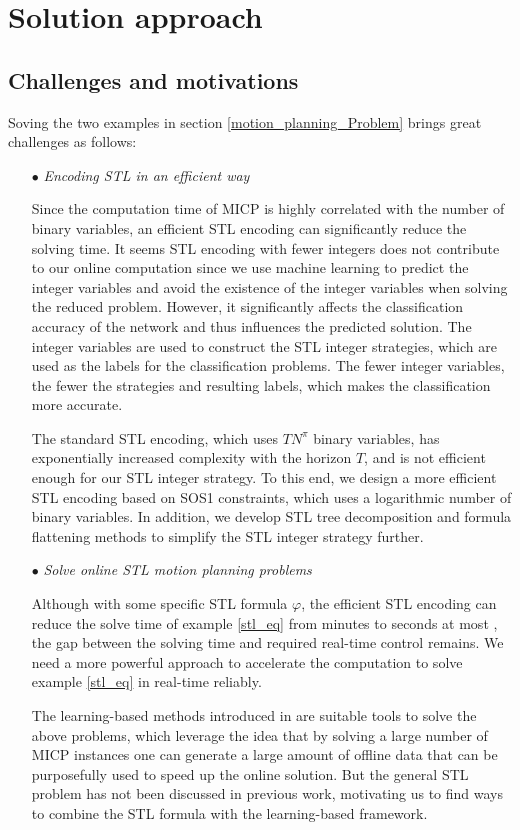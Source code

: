 \documentclass[a4paper]{report}
\begin{document}
\chapter{Solution approach}
\section{Challenges and motivations} 

Soving the two examples in section \ref{motion_planning_Problem} brings great challenges as follows: 

\begin{itemize}
   \item[$\bullet$] \textit{Encoding STL in an efficient way} 
   \item[] 
   Since the computation time of MICP is highly correlated with the number of binary variables, an efficient STL encoding can significantly reduce the solving time. It seems STL encoding with fewer integers does not contribute to our online computation since we use machine learning to predict the integer variables and avoid the existence of the integer variables when solving the reduced problem. However, it significantly affects the classification accuracy of the network and thus influences the predicted solution. The integer variables are used to construct the STL integer strategies, which are used as the labels for the classification problems. The fewer integer variables, the fewer the strategies and resulting labels, which makes the classification more accurate.

   The standard STL encoding, which uses $TN^\pi$ binary variables, has exponentially increased complexity with the horizon $T$, and is not efficient enough for our STL integer strategy. To this end, we design a more efficient STL encoding based on SOS1 constraints, which uses a logarithmic number of binary variables. In addition, we develop STL tree decomposition and formula flattening methods to simplify the STL integer strategy further.

 
  \item[$\bullet$] \textit{Solve online STL motion planning problems}
  \item[]  
  Although with some specific STL formula $\varphi$, the efficient STL encoding can reduce the solve time of example \ref*{stl_eq} from minutes to seconds at most \cite[]{kurtz2022mixed}, the gap between the solving time and required real-time control remains. We need a more powerful approach to accelerate the computation to solve example \ref*{stl_eq} in real-time reliably. 
   
  The learning-based methods introduced in \cite[]{bertsimas2022online}\cite[]{Cauligi2020}\cite[]{bertsimas2021voice}  are suitable tools to solve the above problems, which leverage the idea that by solving a large number of MICP instances one can generate a large amount of offline data that can be purposefully used to speed up the online solution. But the general STL problem has not been discussed in previous work, motivating us to find ways to combine the STL formula with the learning-based framework.

\end{itemize}
\end{document}
